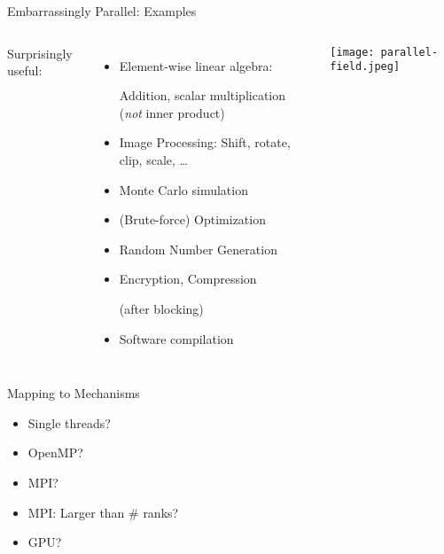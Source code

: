 \documentclass[english,compress]{beamer}
\begin{document}
\begin{frame}{Embarrassingly Parallel: Examples}
  \begin{columns}
      Surprisingly useful:
      \begin{itemize}
        \item Element-wise linear algebra:

          Addition, scalar
          multiplication (\emph{not} inner product)
        \item Image Processing: Shift, rotate, clip, scale, \dots
        \item Monte Carlo simulation
        \item (Brute-force) Optimization
        \item Random Number Generation
        \item Encryption, Compression

          (after blocking)
        \item Software compilation
      \end{itemize}
      \texttt{[image: parallel-field.jpeg]}
  \end{columns}
\end{frame}
\begin{frame}{Mapping to Mechanisms}
  \begin{itemize}[<+->]
    \item Single threads?
    \item OpenMP?
    \item MPI?
    \item MPI: Larger than \# ranks?
    \item GPU?
  \end{itemize}
\end{frame}
\end{document}
